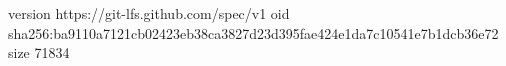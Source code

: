 version https://git-lfs.github.com/spec/v1
oid sha256:ba9110a7121cb02423eb38ca3827d23d395fae424e1da7c10541e7b1dcb36e72
size 71834
